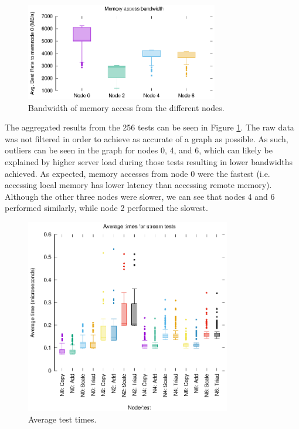 \documentclass[11pt,twoside]{article}
\begin{document}
\begin{figure}
    \centering
    \includegraphics[width=0.75\textwidth]{partb_nodes_best}
    \caption{Bandwidth of memory access from the different nodes.}
    \label{fig:nodes}
\end{figure}

The aggregated results from the 256 tests can be seen in Figure \ref{fig:nodes}. The raw data was not filtered in order to achieve as accurate of a graph as possible. As such, outliers can be seen in the graph for nodes 0, 4, and 6, which can likely be explained by higher server load during those tests resulting in lower bandwidths achieved. As expected, memory accesses from node 0 were the fastest (i.e. accessing local memory has lower latency than accessing remote memory). Although the other three nodes were slower, we can see that nodes 4 and 6 performed similarly, while node 2 performed the slowest.

\begin{figure}
    \centering
    \includegraphics[width=0.8\textwidth]{partb_nodes_avgs}
    \caption{Average test times.}
    \label{fig:nodes_avgs}
\end{figure}
\end{document}
